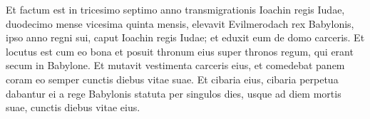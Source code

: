 \begin{biblechapter}
\verse Et factum est in tricesimo septimo anno transmigrationis Ioachin regis Iudae, duodecimo mense vicesima quinta mensis, elevavit Evilmerodach rex Babylonis, ipso anno regni sui, caput Ioachin regis Iudae; et eduxit eum de domo carceris. 
\verse Et locutus est cum eo bona et posuit thronum eius super thronos regum, qui erant secum in Babylone. 
\verse Et mutavit vestimenta carceris eius, et comedebat panem coram eo semper cunctis diebus vitae suae. 
\verse Et cibaria eius, cibaria perpetua dabantur ei a rege Babylonis statuta per singulos dies, usque ad diem mortis suae, cunctis diebus vitae eius.
\end{biblechapter}
